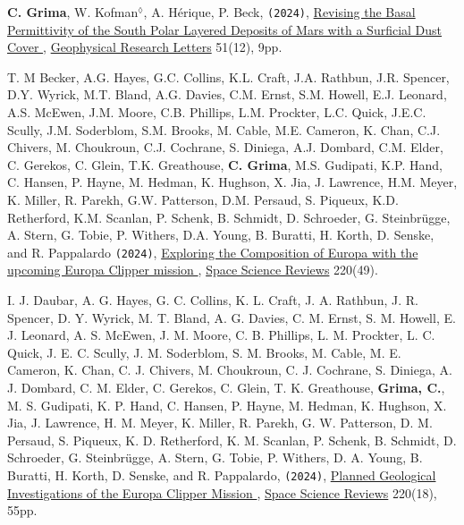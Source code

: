 \begin{etaremune}
\item
  \textbf{C. Grima}, W. Kofman$^\lozenge$, A. Hérique, P. Beck, \texttt{(2024)}, \href{https://agupubs.onlinelibrary.wiley.com/doi/10.1029/2024GL109085}{Revising the Basal Permittivity of the South Polar Layered Deposits of Mars with a Surficial Dust Cover \aiOpenAccessSquare}, \ul{Geophysical Research Letters} 51(12), 9pp.
  
\item
  T. M Becker, A.G. Hayes, G.C. Collins, K.L. Craft, J.A. Rathbun, J.R. Spencer, D.Y. Wyrick, M.T. Bland, A.G. Davies, C.M. Ernst, S.M. Howell, E.J. Leonard, A.S. McEwen, J.M. Moore, C.B. Phillips, L.M. Prockter, L.C. Quick, J.E.C. Scully, J.M. Soderblom, S.M. Brooks, M. Cable, M.E. Cameron, K. Chan, C.J. Chivers, M. Choukroun, C.J. Cochrane, S. Diniega, A.J. Dombard, C.M. Elder, C. Gerekos, C. Glein, T.K. Greathouse, \textbf{C. Grima}, M.S. Gudipati, K.P. Hand, C. Hansen, P. Hayne, M. Hedman, K. Hughson, X. Jia, J. Lawrence, H.M. Meyer, K. Miller, R. Parekh, G.W. Patterson, D.M. Persaud, S. Piqueux, K.D. Retherford, K.M. Scanlan, P. Schenk, B. Schmidt, D. Schroeder, G. Steinbrügge, A. Stern, G. Tobie, P. Withers, D.A. Young, B. Buratti, H. Korth, D. Senske, and R. Pappalardo \texttt{(2024)}, \href{https://link.springer.com/article/10.1007/s11214-024-01069-y}{Exploring the Composition of Europa with the upcoming Europa Clipper mission \aiOpenAccessSquare}, \ul{Space Science Reviews} 220(49).

\item
  I. J. Daubar, A. G. Hayes, G. C. Collins, K. L. Craft, J. A. Rathbun, J. R. Spencer, D. Y. Wyrick, M. T. Bland, A. G. Davies, C. M. Ernst, S. M. Howell, E. J. Leonard, A. S. McEwen, J. M. Moore, C. B. Phillips, L. M. Prockter, L. C. Quick, J. E. C. Scully, J. M. Soderblom, S. M. Brooks, M. Cable, M. E. Cameron, K. Chan, C. J. Chivers, M. Choukroun, C. J. Cochrane, S. Diniega, A. J. Dombard, C. M. Elder, C. Gerekos, C. Glein, T. K. Greathouse, \textbf{Grima, C.}, M. S. Gudipati, K. P. Hand, C. Hansen, P. Hayne, M. Hedman, K. Hughson, X. Jia, J. Lawrence, H. M. Meyer, K. Miller, R. Parekh, G. W. Patterson, D. M. Persaud, S. Piqueux, K. D. Retherford, K. M. Scanlan, P. Schenk, B. Schmidt, D. Schroeder, G. Steinbrügge, A. Stern, G. Tobie, P. Withers, D. A. Young, B. Buratti, H. Korth, D. Senske, and R. Pappalardo, \texttt{(2024)}, \href{https://link.springer.com/article/10.1007/s11214-023-01036-z?utm_source=rct_congratemailt&utm_medium=email&utm_campaign=oa_20240212&utm_content=10.1007/s11214-023-01036-z}{Planned Geological Investigations of the Europa Clipper Mission \aiOpenAccessSquare}, \ul{Space Science Reviews} 220(18), 55pp.


\end{etaremune}
